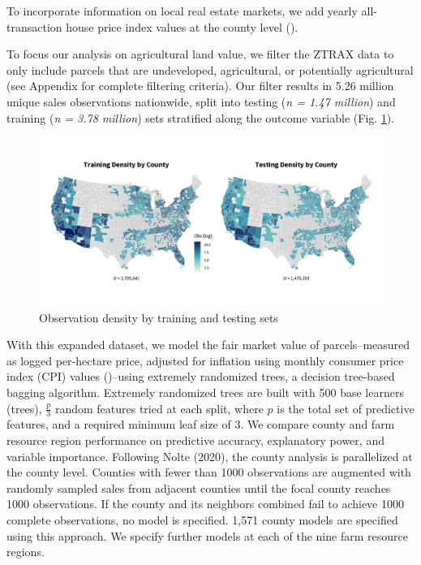 \documentclass[12pt]{article}
\begin{document}
To incorporate information on local real estate markets, we add yearly all-transaction house price index values at the county level (\cite{FederalHousing2022}).

To focus our analysis on agricultural land value, we filter the ZTRAX data to only include parcels that are undeveloped, agricultural, or potentially agricultural (see Appendix for complete filtering criteria).
Our filter results in 5.26 million unique sales observations nationwide, split into testing (\textit{n = 1.47 million}) and training (\textit{n = 3.78 million}) sets stratified along the outcome variable (Fig. \ref{fig:train_test}).

\begin{figure}
    \centering
    \includegraphics[width=6in]{figures/test_train_density.png}
    \caption{Observation density by training and testing sets}
    \label{fig:train_test}
\end{figure}

With this expanded dataset, we model the fair market value of parcels--measured as logged per-hectare price, adjusted for inflation using monthly consumer price index (CPI) values (\cite{blsConsumerPrice})--using extremely randomized trees, a decision tree-based bagging algorithm. Extremely randomized trees are built with 500 base learners (trees), $\frac{p}{3}$ random features tried at each split, where $p$ is the total set of predictive features, and a required minimum leaf size of 3. We compare county and farm resource region performance on predictive accuracy, explanatory power, and variable importance. Following Nolte (2020), the county analysis is parallelized at the county level. Counties with fewer than 1000 observations are augmented with randomly sampled sales from adjacent counties until the focal county reaches 1000 observations. If the county and its neighbors combined fail to achieve 1000 complete observations, no model is specified. 1,571 county models are specified using this approach. We specify further models at each of the nine farm resource regions. 
\end{document}
